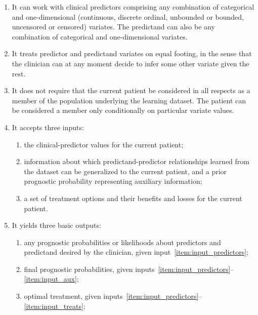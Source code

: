 \documentclass[a4paper,12pt,%
onecolumn,oneside,article,%
british%
]{memoir}
\theoremstyle{remark}
\theoremstyle{innote}
\renewcommand*{\|}[1][]{\nonscript\:#1\vert\nonscript\:\mathopen{}}
\begin{document}
\begin{enumerate}[label=\arabic*.]
\item\label{item:feat_variates} It can work with clinical predictors comprising any combination of categorical and one-dimensional (continuous, discrete ordinal, unbounded or bounded, uncensored or censored) variates. The predictand can also be any combination of categorical and one-dimensional variates.

\item\label{item:feat_indifferentvariates} It treats predictor and predictand variates on equal footing, in the sense that the clinician can at any moment decide to infer some other variate given the rest.
\item\label{item:feat_conditionalstats} It does not require that the current patient be considered in all respects as a member of the population underlying the learning dataset. The patient can be considered a member only conditionally on particular variate values.

\item\label{item:feat_inputs} It accepts three inputs:
  \begin{enumerate}[label=(i\arabic*)]
  \item\label{item:input_predictors} the clinical-predictor values for the current patient;
  \item\label{item:input_aux} information about which predictand-predictor relationships learned from the dataset can be generalized to the current patient, and a prior prognostic probability representing auxiliary information;
  \item\label{item:input_treats} a set of treatment options and their benefits and losses for the current patient.
  \end{enumerate}

\item\label{item:feat_outputs} It yields three basic outputs:
  \begin{enumerate}[label=(o\arabic*)]
  \item\label{item:ouput_predictors} any prognostic probabilities or likelihoods about predictors and predictand desired by the clinician, given input~\ref{item:input_predictors};
  \item\label{item:output_aux} final prognostic probabilities, given inputs~\ref{item:input_predictors}--\ref{item:input_aux};
  \item\label{item:output_treats} optimal treatment, given inputs~\ref{item:input_predictors}--\ref{item:input_treats};
  \end{enumerate}
  

\end{enumerate}
\end{document}
